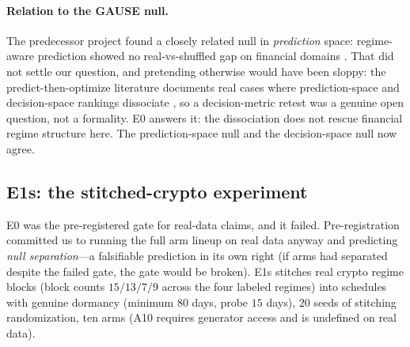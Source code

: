 \paragraph{Relation to the GAUSE null.} The predecessor project found a
closely related null in \emph{prediction} space: regime-aware prediction
showed no real-vs-shuffled gap on financial domains \citep{li2026gause}.
That did not settle our question, and pretending otherwise would have been
sloppy: the predict-then-optimize literature documents real cases where
prediction-space and decision-space rankings dissociate
\citep{elmachtoub2022smart,yan2026invpnco}, so a decision-metric retest was
a genuine open question, not a formality. E0 answers it: the dissociation
does not rescue financial regime structure here. The prediction-space null
and the decision-space null now agree.

\subsection{E1s: the stitched-crypto experiment}
\label{sec:dd5-e1s}

E0 was the pre-registered gate for real-data claims, and it failed.
Pre-registration committed us to running the full arm lineup on real data
anyway and predicting \emph{null separation}---a falsifiable prediction in
its own right (if arms had separated despite the failed gate, the gate
would be broken). E1s stitches real crypto regime blocks (block counts
$15/13/7/9$ across the four labeled regimes) into schedules with genuine
dormancy (minimum $80$ days, probe $15$ days), $20$ seeds of stitching
randomization, ten arms (A10 requires generator access and is undefined on
real data).

